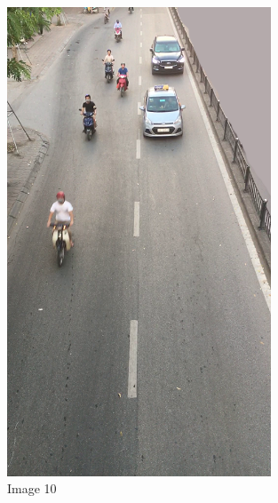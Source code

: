 \begin{center}
    \begin{figure}[H]
        \centering
      \includegraphics[width=0.7\textwidth]{Chapters/Fig/10}
      \caption{Image 10}
      \label{fig:img10}
  \end{figure}
\end{center}

